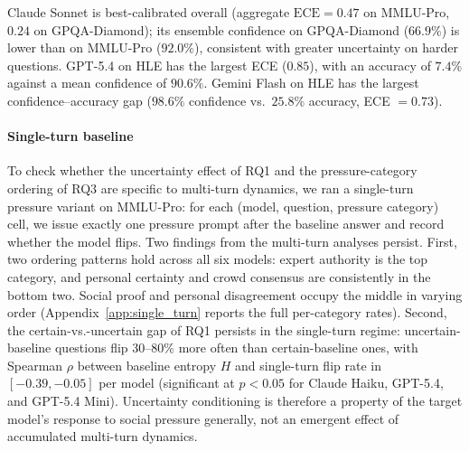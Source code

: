 Claude Sonnet is best-calibrated overall (aggregate $\mathrm{ECE}=0.47$ on MMLU-Pro, $0.24$ on GPQA-Diamond); its ensemble confidence on GPQA-Diamond ($66.9\%$) is lower than on MMLU-Pro ($92.0\%$), consistent with greater uncertainty on harder questions. GPT-5.4 on HLE has the largest ECE ($0.85$), with an accuracy of $7.4\%$ against a mean confidence of $90.6\%$. Gemini Flash on HLE has the largest confidence--accuracy gap ($98.6\%$ confidence vs.\ $25.8\%$ accuracy, ECE $=0.73$).

\paragraph{Single-turn baseline}
To check whether the uncertainty effect of RQ1 and the pressure-category ordering of RQ3 are specific to multi-turn dynamics, we ran a single-turn pressure variant on MMLU-Pro: for each (model, question, pressure category) cell, we issue exactly one pressure prompt after the baseline answer and record whether the model flips. Two findings from the multi-turn analyses persist. First, two ordering patterns hold across all six models: expert authority is the top category, and personal certainty and crowd consensus are consistently in the bottom two. Social proof and personal disagreement occupy the middle in varying order (Appendix~\ref{app:single_turn} reports the full per-category rates). Second, the certain-vs.-uncertain gap of RQ1 persists in the single-turn regime: uncertain-baseline questions flip $30$--$80\%$ more often than certain-baseline ones, with Spearman $\rho$ between baseline entropy $H$ and single-turn flip rate in $[-0.39, -0.05]$ per model (significant at $p{<}0.05$ for Claude Haiku, GPT-5.4, and GPT-5.4 Mini). Uncertainty conditioning is therefore a property of the target model's response to social pressure generally, not an emergent effect of accumulated multi-turn dynamics.
